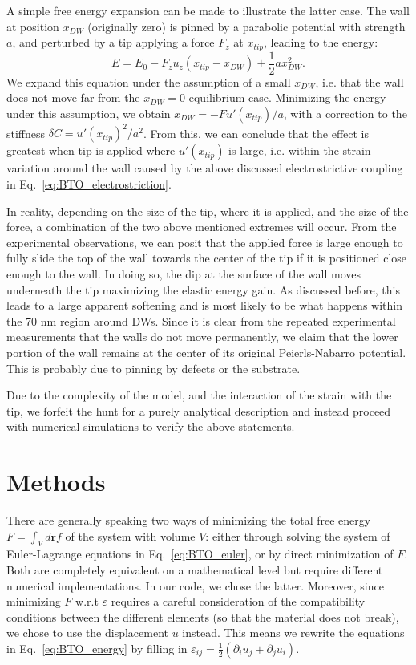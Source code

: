 A simple free energy expansion can be made to illustrate the latter case.
The wall at position $x_{DW}$ (originally zero) is pinned by a parabolic potential with strength $a$, and perturbed by a tip applying a force $F_z$ at $x_{tip}$, leading to the energy:
\begin{equation}
	E = E_0 - F_z u_z (x_{tip} - x_{DW}) + \frac{1}{2}a x_{DW}^2.
\end{equation}
We expand this equation under the assumption of a small $x_{DW}$, i.e. that the wall does not move far from the $x_{DW}=0$ equilibrium case.
Minimizing the energy under this assumption, we obtain $x_{DW} = -F u'(x_{tip})/a$, with a correction to the stiffness $\delta C = u'(x_{tip})^2/a^2$.
From this, we can conclude that the effect is greatest when tip is applied where $u'(x_{tip})$ is large, i.e. within the strain variation around the wall caused by the above discussed electrostrictive coupling in Eq.~\eqref{eq:BTO_electrostriction}.

In reality, depending on the size of the tip, where it is applied, and the size of the force, a combination of the two above mentioned extremes will occur.
From the experimental observations, we can posit that the applied force is large enough to fully slide the top of the wall towards the center of the tip if it is positioned close enough to the wall.
In doing so, the dip at the surface of the wall moves underneath the tip maximizing the elastic energy gain.
As discussed before, this leads to a large apparent softening and is most likely to be what happens within the 70 nm region around \glspl{DW}.
Since it is clear from the repeated experimental measurements that the walls do not move permanently, we claim that the lower portion of the wall remains at the center of its original Peierls-Nabarro potential.
This is probably due to pinning by defects or the substrate.

Due to the complexity of the model, and the interaction of the strain with the tip, we forfeit the hunt for a purely analytical description and instead proceed with numerical simulations to verify the above statements.

\section{Methods \label{sec:BTO_methods}}
There are generally speaking two ways of minimizing the total free energy $F=\int_V d\bm{r} f$ of the system with volume $V$: either through solving the system of Euler-Lagrange equations in Eq.~\eqref{eq:BTO_euler}, or by direct minimization of $F$.
Both are completely equivalent on a mathematical level but require different numerical implementations.
In our code, we chose the latter.
Moreover, since minimizing $F$ w.r.t $\varepsilon$ requires a careful consideration of the compatibility conditions between the different elements (so that the material does not break)\cite{Marton2007}, we chose to use the displacement $u$ instead.
This means we rewrite the equations in Eq.~\eqref{eq:BTO_energy} by filling in $\varepsilon_{ij} = \frac{1}{2}(\partial_i u_j + \partial_j u_i)$.

